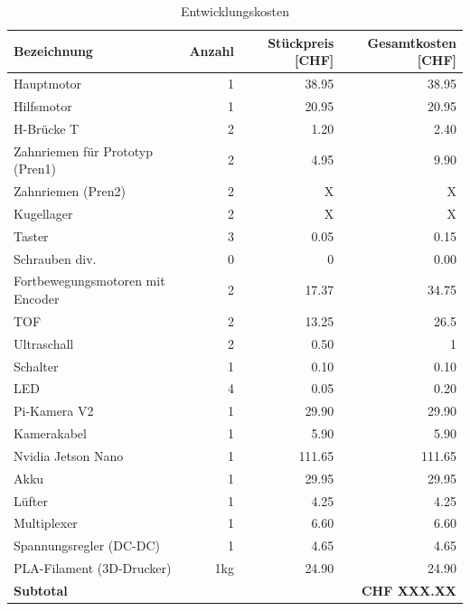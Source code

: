 \begin{center}
\centering
\begin{table}[H]
\begin{tabular}{|l|r|r|r|}
\hline 
\textbf{Bezeichnung} & \textbf{Anzahl} &
\textbf{Stückpreis [CHF]} & \textbf{Gesamtkosten [CHF]} \\
\hline 
Hauptmotor & 1 & 38.95 & 38.95 \\
\hline
Hilfsmotor & 1 & 20.95 & 20.95 \\
\hline
H-Brücke T & 2 & 1.20 & 2.40 \\
\hline
Zahnriemen für Prototyp (Pren1) & 2 & 4.95 & 9.90 \\
\hline
Zahnriemen (Pren2)  & 2 & X & X \\
\hline
Kugellager & 2 & X & X \\
\hline
Taster & 3 & 0.05  & 0.15 \\
\hline
Schrauben div. & 0 & 0 & 0.00 \\
\hline
Fortbewegungsmotoren mit Encoder & 2 & 17.37 & 34.75 \\
\hline
TOF & 2 & 13.25 & 26.5 \\
\hline
Ultraschall & 2 & 0.50 & 1 \\
\hline
Schalter & 1 & 0.10 & 0.10 \\
\hline
LED & 4 & 0.05 & 0.20 \\
\hline
Pi-Kamera V2 & 1 & 29.90 & 29.90 \\
\hline
Kamerakabel & 1 & 5.90 & 5.90 \\
\hline
Nvidia Jetson Nano & 1 & 111.65 & 111.65 \\
\hline
Akku & 1 & 29.95 & 29.95 \\
\hline
Lüfter & 1 & 4.25 & 4.25 \\
\hline
Multiplexer & 1 & 6.60 & 6.60 \\
\hline
Spannungsregler (DC-DC) & 1 & 4.65 & 4.65 \\
\hline
PLA-Filament (3D-Drucker) & 1kg & 24.90 & 24.90 \\
\hline

\hline \hline 
 \textbf{Subtotal} &&& \textbf{CHF XXX.XX}\\
\hline 
\end{tabular}
\caption[Entwicklungskosten]{Entwicklungskosten}
\label{tab:kosten}
\end{table}
\end{center}